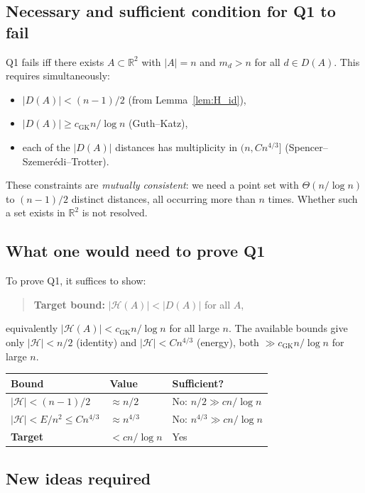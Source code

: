 \documentclass[12pt,a4paper]{amsart}
\theoremstyle{plain}
\theoremstyle{definition}
\newcommand{\R}{\mathbb{R}}
\newcommand{\abs}[1]{\left\lvert #1 \right\rvert}
\newcommand{\cH}{\mathcal{H}}
\begin{document}
\subsection{Necessary and sufficient condition for Q1 to fail}

Q1 fails iff there exists $A \subset \R^2$ with $\abs{A} = n$ and
$m_d > n$ for all $d \in D(A)$.  This requires simultaneously:
\begin{itemize}
  \item $\abs{D(A)} < (n-1)/2$ (from Lemma~\ref{lem:H_id}),
  \item $\abs{D(A)} \ge c_{\mathrm{GK}} n/\log n$ (Guth--Katz),
  \item each of the $\abs{D(A)}$ distances has multiplicity in
        $(n, C n^{4/3}]$ (Spencer--Szemer\'edi--Trotter).
\end{itemize}

These constraints are \emph{mutually consistent}: we need a
point set with $\Theta(n/\log n)$ to $(n-1)/2$ distinct distances,
all occurring more than $n$ times.  Whether such a set exists in
$\R^2$ is not resolved.

\subsection{What one would need to prove Q1}

To prove Q1, it suffices to show:
\begin{quote}
\textbf{Target bound:} $\abs{\cH(A)} < \abs{D(A)}$ for all $A$,
\end{quote}
equivalently $\abs{\cH(A)} < c_{\mathrm{GK}} n/\log n$ for all large $n$.
The available bounds give only $\abs{\cH} < n/2$ (identity) and
$\abs{\cH} < Cn^{4/3}$ (energy), both
$\gg c_{\mathrm{GK}} n / \log n$ for large $n$.

\begin{center}
\begin{tabular}{lll}
\toprule
Bound & Value & Sufficient? \\
\midrule
$\abs{\cH} < (n-1)/2$ & $\approx n/2$ & No: $n/2 \gg cn/\log n$ \\
$\abs{\cH} < E/n^2 \le Cn^{4/3}$ & $\approx n^{4/3}$ & No: $n^{4/3} \gg cn/\log n$ \\
\textbf{Target} & $< cn/\log n$ & Yes \\
\bottomrule
\end{tabular}
\end{center}

\subsection{New ideas required}
\end{document}
